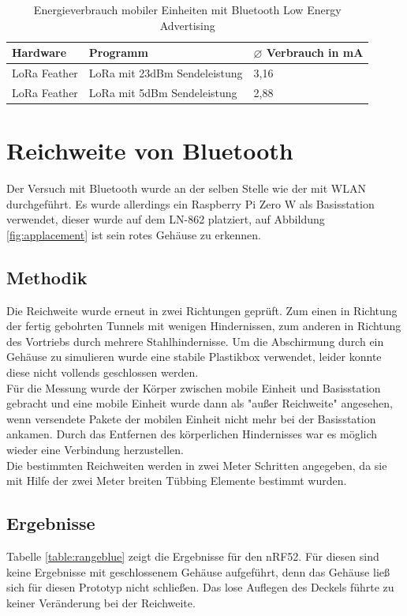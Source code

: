 \begin{table}[h!]
	\centering
	\caption{Energieverbrauch mobiler Einheiten mit Bluetooth Low Energy Advertising}
	\label{table:lora235ina}
	\begin{tabular}{p{3.5cm}|p{7.5cm}|p{2.5cm}}
		Hardware & Programm & $\varnothing$ Verbrauch in mA \\
		\hline
		LoRa Feather & LoRa mit 23dBm Sendeleistung & 3,16 \\
		LoRa Feather & LoRa mit 5dBm Sendeleistung & 2,88 \\
	\end{tabular}
\end{table}

\section{Reichweite von Bluetooth}
Der Versuch mit Bluetooth wurde an der selben Stelle wie der mit WLAN durchgeführt.
Es wurde allerdings ein Raspberry Pi Zero W als Basisstation verwendet, dieser wurde auf dem LN-862 platziert, auf Abbildung \ref{fig:applacement} ist sein rotes Gehäuse zu erkennen.

\subsection{Methodik}
Die Reichweite wurde erneut in zwei Richtungen geprüft. 
Zum einen in Richtung der fertig gebohrten Tunnels mit wenigen Hindernissen, zum anderen in Richtung des Vortriebs durch mehrere Stahlhindernisse.
Um die Abschirmung durch ein Gehäuse zu simulieren wurde eine stabile Plastikbox verwendet, leider konnte diese nicht vollends geschlossen werden.\\
Für die Messung wurde der Körper zwischen mobile Einheit und Basisstation gebracht und eine mobile Einheit wurde dann als "außer Reichweite" angesehen, wenn versendete Pakete der mobilen Einheit nicht mehr bei der Basisstation ankamen.
Durch das Entfernen des körperlichen Hindernisses war es möglich wieder eine Verbindung herzustellen.\\
Die bestimmten Reichweiten werden in zwei Meter Schritten angegeben, da sie mit Hilfe der zwei Meter breiten Tübbing Elemente bestimmt wurden.

\subsection{Ergebnisse}
Tabelle \ref{table:rangeblue} zeigt die Ergebnisse für den nRF52.
Für diesen sind keine Ergebnisse mit geschlossenem Gehäuse aufgeführt, denn das Gehäuse ließ sich für diesen Prototyp nicht schließen.
Das lose Auflegen des Deckels führte zu keiner Veränderung bei der Reichweite.

